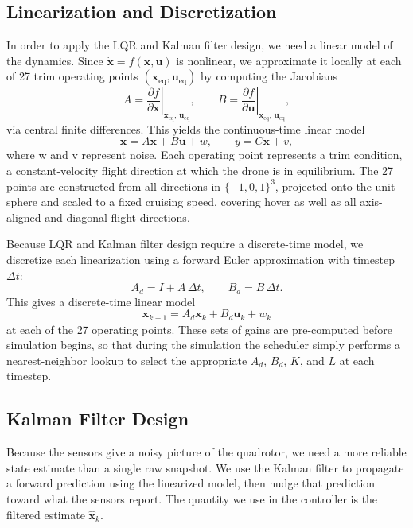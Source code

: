 \documentclass[11pt]{amsart}
\begin{document}
\subsection{Linearization and Discretization}


In order to apply the LQR and Kalman filter design, we need a linear model of the 
dynamics. Since $\dot{\mathbf{x}} = f(\mathbf{x}, \mathbf{u})$ is nonlinear, we 
approximate it locally at each of 27 trim operating points 
$(\mathbf{x}_{\text{eq}}, \mathbf{u}_{\text{eq}})$ by computing the Jacobians
\[
A = \left.\frac{\partial f}{\partial \mathbf{x}}\right|_{\mathbf{x}_{\text{eq}},\,\mathbf{u}_{\text{eq}}}, 
\qquad
B = \left.\frac{\partial f}{\partial \mathbf{u}}\right|_{\mathbf{x}_{\text{eq}},\,\mathbf{u}_{\text{eq}}},
\]
via central finite differences. This yields the continuous-time linear model
\[
\dot{\mathbf{x}} = A\mathbf{x} + B\mathbf{u} + w, \qquad y = C\mathbf{x} + v,
\]
where w and v represent noise. Each operating point represents a trim condition, a constant-velocity flight direction at which 
the drone is in equilibrium. The 27 points are constructed from all directions in 
$\{-1, 0, 1\}^3$, projected onto the unit sphere and scaled to a fixed cruising 
speed, covering hover as well as all axis-aligned and diagonal flight directions.

Because LQR and Kalman filter design require a discrete-time model, we discretize 
each linearization using a forward Euler approximation with timestep $\Delta t$:
\[
A_d = I + A\,\Delta t, \qquad B_d = B\,\Delta t.
\]
This gives a discrete-time linear model
\[
\mathbf{x}_{k+1} = A_d \mathbf{x}_k + B_d \mathbf{u}_k + w_k
\]
at each of the 27 operating points. These sets of gains are pre-computed
before simulation begins, so that during the simulation the scheduler simply performs a nearest-neighbor lookup to select the appropriate $A_d$, $B_d$, $K$, and $L$ at each timestep.

\subsection{Kalman Filter Design}

Because the sensors give a noisy picture of the quadrotor, we need a more reliable state estimate than a single raw snapshot. We use the Kalman filter to propagate a forward prediction using the linearized model, then nudge that prediction toward what the sensors report. The quantity we use in the controller is the filtered estimate $\hat{\mathbf{x}}_k$.
\end{document}
